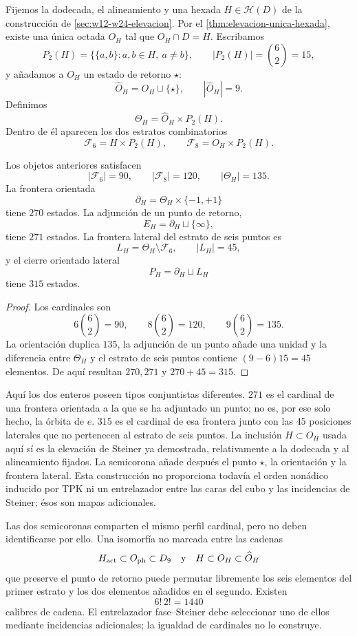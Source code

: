 Fijemos la dodecada, el alineamiento y una hexada
\(H\in\mathcal H(D)\) de la construcción de
\cref{sec:w12-w24-elevacion}. Por el
\cref{thm:elevacion-unica-hexada}, existe una única octada \(O_H\) tal que
\(O_H\cap D=H\). Escribamos
\[
 P_2(H)=\{\{a,b\}:a,b\in H,\ a\ne b\},
 \qquad |P_2(H)|=\binom62=15,
\]
y añadamos a \(O_H\) un estado de retorno \(\star\):
\[
 \widehat O_H=O_H\sqcup\{\star\},
 \qquad |\widehat O_H|=9.
\]
Definimos
\[
 \Theta_H=\widehat O_H\times P_2(H).
\]
Dentro de él aparecen los dos estratos combinatorios
\[
 \mathcal F_6=H\times P_2(H),
 \qquad
 \mathcal F_8=O_H\times P_2(H).
\]

\begin{theorem}
\label{thm:realizacion-semicorona}
Los objetos anteriores satisfacen
\[
 |\mathcal F_6|=90,
 \qquad
 |\mathcal F_8|=120,
 \qquad
 |\Theta_H|=135.
\]
La frontera orientada
\[
 \partial_H=\Theta_H\times\{-1,+1\}
\]
tiene \(270\) estados. La adjunción de un punto de retorno,
\[
 E_H=\partial_H\sqcup\{\infty\},
\]
tiene \(271\) estados. La frontera lateral del estrato de seis puntos es
\[
 L_H=\Theta_H\setminus\mathcal F_6,
 \qquad |L_H|=45,
\]
y el cierre orientado lateral
\[
 P_H=\partial_H\sqcup L_H
\]
tiene \(315\) estados.
\end{theorem}

\begin{proof}
Los cardinales son
\[
 6\binom62=90,
 \qquad
 8\binom62=120,
 \qquad
 9\binom62=135.
\]
La orientación duplica \(135\), la adjunción de un punto añade una unidad y
la diferencia entre \(\Theta_H\) y el estrato de seis puntos contiene
\((9-6)15=45\) elementos. De aquí resultan \(270,271\) y
\(270+45=315\).
\end{proof}

Aquí los dos enteros poseen tipos conjuntistas diferentes. \(271\) es el
cardinal de una frontera orientada a la que se ha adjuntado un punto; no es,
por ese solo hecho, la órbita de \(e\). \(315\) es el cardinal de esa
frontera junto con las \(45\) posiciones laterales que no pertenecen al
estrato de seis puntos. La inclusión \(H\subset O_H\) usada aquí sí es la
elevación de Steiner ya demostrada, relativamente a la dodecada y al
alineamiento fijados. La semicorona añade después el punto \(\star\), la
orientación y la frontera lateral. Esta construcción no proporciona todavía
el orden nonádico inducido por TPK ni un entrelazador entre las caras del cubo
y las incidencias de Steiner; ésos son mapas adicionales.

Las dos semicoronas comparten el mismo perfil cardinal, pero no deben
identificarse por ello. Una isomorfía no marcada entre las cadenas
\[
 H_{\rm act}\subset O_{\rm ph}\subset D_9
 \quad\text{y}\quad
 H\subset O_H\subset\widehat O_H
\]
que preserve el punto de retorno puede permutar libremente los seis elementos
del primer estrato y los dos elementos añadidos en el segundo. Existen
\[
 \boxed{6!\,2!=1440}
\]
calibres de cadena. El entrelazador fase--Steiner debe seleccionar uno de
ellos mediante incidencias adicionales; la igualdad de cardinales no lo
construye.

